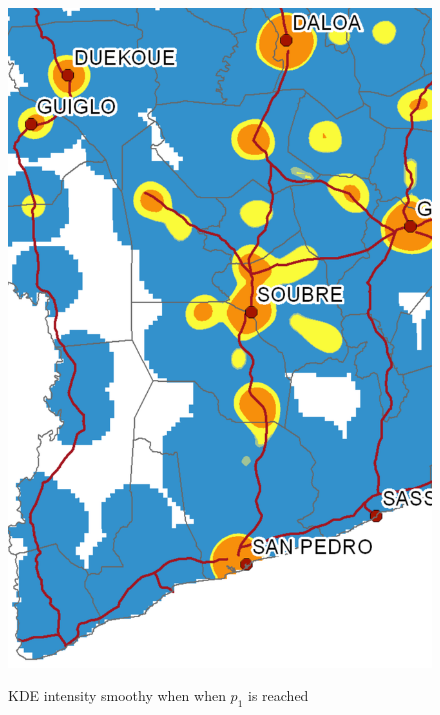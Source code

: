 \begin{figure}
{    \includegraphics[scale = 0.15]{results/images/kernel/l_hour19_kd_detail.pdf}
	\label{fig:subfig2_detail}
}
\caption[KDE intensity smoothy when $p_1$ is reached]{KDE intensity smoothy when when  $p_1$ is reached}
\label{fig:subfigureExample}
\end{figure}




\newpage

